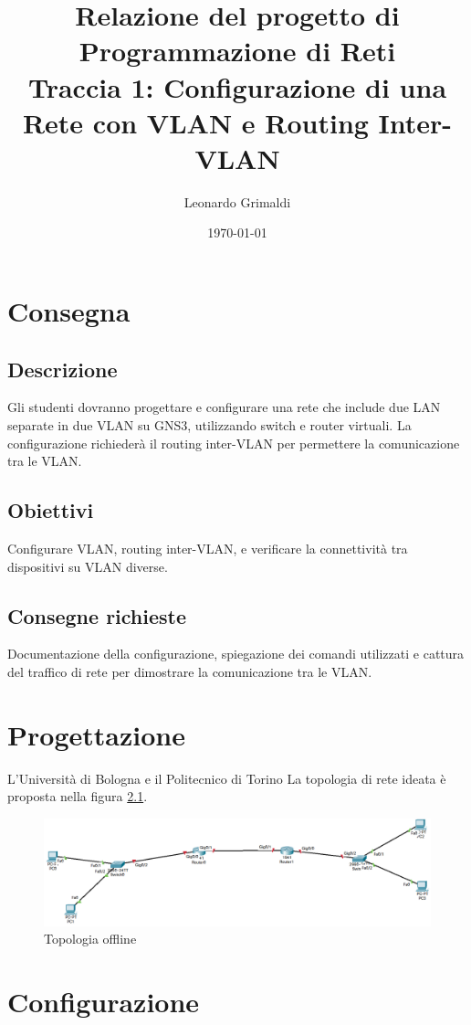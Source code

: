 \documentclass[a4paper,12pt]{report}
\title{Relazione del progetto di Programmazione di Reti 
    \\ Traccia 1: Configurazione di una Rete con VLAN e Routing Inter-VLAN}
\author{Leonardo Grimaldi}
\date{\today}
\begin{document}
\maketitle
\tableofcontents
\chapter{Consegna}
\section{Descrizione}
Gli studenti dovranno progettare e configurare una rete che include due LAN separate in due VLAN su GNS3, utilizzando switch e router virtuali. La configurazione richiederà il routing inter-VLAN per permettere la comunicazione tra le VLAN.
\section{Obiettivi}
Configurare VLAN, routing inter-VLAN, e verificare la connettività tra dispositivi su VLAN diverse.
\section{Consegne richieste}
Documentazione della configurazione, spiegazione dei comandi utilizzati e cattura del traffico di rete per dimostrare la comunicazione tra le VLAN.
\chapter{Progettazione}
L'Università di Bologna e il Politecnico di Torino 
La topologia di rete ideata è proposta nella figura \ref{fig:topologia_offline}. 
\begin{figure}
\includegraphics[width=\textwidth]{topology_offline.png}
\caption{Topologia offline}
\label{fig:topologia_offline}
\end{figure}
\chapter{Configurazione}
\end{document}
